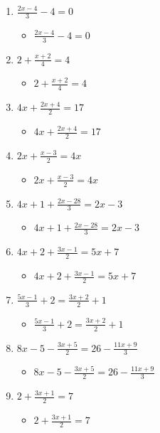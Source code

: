 \begin{enumerate}
\begin{itemize}
  \end{itemize}
\item {\Large $\frac{2x-4}{3}-4=0$}
  \begin{itemize}
  \item {\Large $\frac{2x-4}{3}-4=0$}
  \end{itemize}
\item {\Large $2+\frac{x+2}{4}=4$}
  \begin{itemize}
  \item {\Large $2+\frac{x+2}{4}=4$}
  \end{itemize}
\item {\Large $4x+\frac{2x+4}{2}=17$}
  \begin{itemize}
  \item {\Large $4x+\frac{2x+4}{2}=17$}
  \end{itemize}
\item {\Large $2x+\frac{x-3}{2}=4x$}
  \begin{itemize}
  \item {\Large $2x+\frac{x-3}{2}=4x$}
  \end{itemize}
\item {\Large $4x+1+\frac{2x-28}{3}=2x-3$}
  \begin{itemize}
  \item {\Large $4x+1+\frac{2x-28}{3}=2x-3$}
  \end{itemize}
\item {\Large $4x+2+\frac{3x-1}{2}=5x+7$}
  \begin{itemize}
  \item {\Large $4x+2+\frac{3x-1}{2}=5x+7$}
  \end{itemize}
\item {\Large $\frac{5x-1}{3}+2=\frac{3x+2}{2}+1$}
  \begin{itemize}
  \item {\Large $\frac{5x-1}{3}+2=\frac{3x+2}{2}+1$}
  \end{itemize}
\item {\Large $8x-5-\frac{3x+5}{2}=26-\frac{11x+9}{3}$}
  \begin{itemize}
  \item {\Large $8x-5-\frac{3x+5}{2}=26-\frac{11x+9}{3}$}
  \end{itemize}
\item {\Large $2+\frac{3x+1}{2}=7$}
  \begin{itemize}
  \item {\Large $2+\frac{3x+1}{2}=7$}

\end{itemize}
\end{enumerate}
